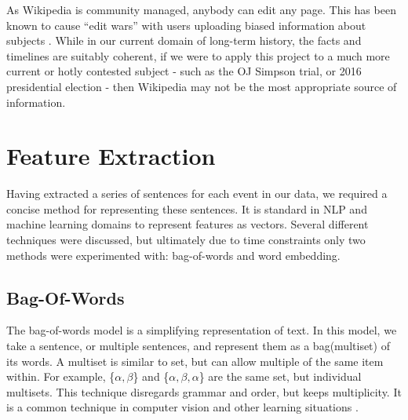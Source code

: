 \documentclass[bsc,frontabs,twoside,singlespacing,parskip,deptreport]{infthesis}     %
\begin{document}
As Wikipedia is community managed, anybody can edit any page. This has been known to cause ``edit wars'' with users
uploading biased information about subjects \cite{}.
While in our current domain of long-term history, the facts and timelines are suitably coherent, if we were to apply this project
to a much more current or hotly contested subject - such as the OJ Simpson trial, or 2016 presidential election - then Wikipedia
may not be the most appropriate source of information.


\section{Feature Extraction}\label{sec:representation}
Having extracted a series of sentences for each event in our data, we required a concise method
for representing these sentences. It is standard in NLP and machine learning domains to represent features as vectors.
Several different techniques were discussed, but ultimately due to time constraints only two methods were
experimented with: bag-of-words and word embedding.
\subsection{Bag-Of-Words}
The bag-of-words model is a simplifying representation of text.
In this model, we take a sentence, or multiple sentences, and represent them as a bag(multiset) of its words.
A multiset is similar to set, but can allow multiple of the same item within.
For example, \{$\alpha,\beta$\} and \{$\alpha,\beta,\alpha$\} are the same set, but individual multisets.
This technique disregards grammar and order, but keeps multiplicity. It is a common technique in computer vision
and other learning situations \cite{sivic2009efficient}.
\end{document}
